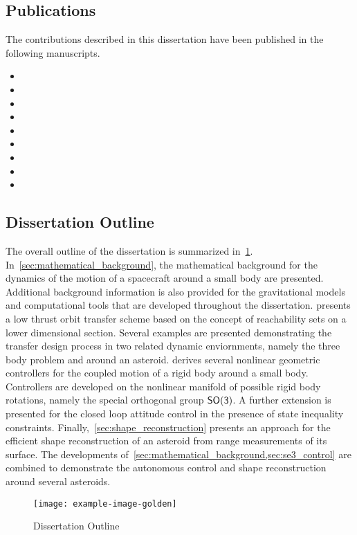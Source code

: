 \subsection{Publications}

The contributions described in this dissertation have been published in the following manuscripts.


\begin{itemize}
    \item {}
    \item {}
    \item {}
    \item {}
    \item {}
    \item {}
    \item {}
    \item {}
    \item {}
\end{itemize}

\subsection{Dissertation Outline}

The overall outline of the dissertation is summarized in~\cref{fig:dissertation_outline}.
In~\cref{sec:mathematical_background}, the mathematical background for the dynamics of the motion of a spacecraft around a small body are presented. 
Additional background information is also provided for the gravitational models and computational tools that are developed throughout the dissertation.
 presents a low thrust orbit transfer scheme based on the concept of reachability sets on a lower dimensional \Poincare section.
Several examples are presented demonstrating the transfer design process in two related dynamic enviornments, namely the three body problem and around an asteroid.
 derives several nonlinear geometric controllers for the coupled motion of a rigid body around a small body.
Controllers are developed on the nonlinear manifold of possible rigid body rotations, namely the special orthogonal group \( \mathsf{SO(3)} \).
A further extension is presented for the closed loop attitude control in the presence of state inequality constraints.
Finally,~\cref{sec:shape_reconstruction} presents an approach for the efficient shape reconstruction of an asteroid from range measurements of its surface.
The developments of~\cref{sec:mathematical_background,sec:se3_control} are combined to demonstrate the autonomous control and shape reconstruction around several asteroids.

\begin{figure}[htbp]
    \centering
    \texttt{[image: example-image-golden]}
    \caption{Dissertation Outline\label{fig:dissertation_outline}}
\end{figure}




